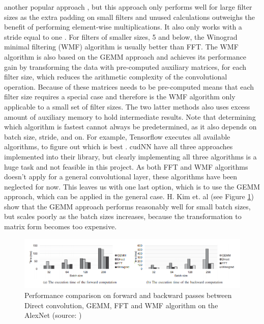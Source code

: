 another popular approach \cite{DBLP:journals/corr/VasilacheJMCPL14}, but this
approach only performs well for large filter sizes as the extra padding on small
filters and unused calculations outweighs the benefit of performing element-wise
multiplications. 
It also only works with a stride equal to one \cite[p. 59]{Performance}. 
For filters of smaller sizes, 5 and below, the Winograd minimal filtering (WMF)
\cite{DBLP:journals/corr/Lavin15b} algorithm is usually better than FFT. 
The WMF algorithm is also based on the GEMM approach and achieves its
performance gain by transforming the data with pre-computed auxiliary matrices,
for each filter size, which reduces the arithmetic complexity of the
convolutional operation. 
Because of these matrices needs to be pre-computed means that each filter size
requires a special case and therefore is the WMF algorithm only applicable to a
small set of filter sizes. The two latter methods also uses excess amount of
auxiliary memory to hold intermediate results. \newline \newline 
Note that determining which algorithm is fastest cannot always be predetermined,
as it also depends on batch size, stride, and on. 
For example, Tensorflow executes all available algorithms, to figure out which
is best \cite[p. 60]{Performance}. cudNN \cite{nvidia} have all three approaches
implemented into their library, but clearly implementing all three algorithms is
a huge task and not feasible in this project. 
As both FFT and WMF algorithms doesn't apply for a general convolutional layer,
these algorithms have been neglected for now.  \newline \newline 
This leaves us with one last option, which is to use the GEMM approach, which
can be applied in the general case. H. Kim et. al \cite{Performance} (see Figure
\ref{fig:performance}) show that the GEMM approach performs reasonably well for
small batch sizes, but scales poorly as the batch sizes increases, because the
transformation to matrix form becomes too expensive.
\begin{figure}[!htbp]
	\centering
	\includegraphics[width=\textwidth]{pics/performance}
	\caption{Performance comparison on forward and backward passes between  Direct
		convolution, GEMM, FFT and WMF algorithm on the AlexNet (source:
		\cite{Performance})}
	\label{fig:performance}
\end{figure}\newline 
